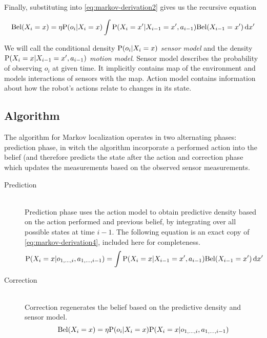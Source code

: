 Finally, substituting into \eqref{eq:markov-derivation2} gives us the recursive
equation

\begin{equation}
	\label{eq:markov-final}
	\Bel(X_i = x) =
	\eta \P(o_i | X_i = x)
		\int
		\P(X_i = x' | X_{i - 1}=x', a_{i - 1})
		\Bel(X_{i-1} = x')
		\,\mathrm{d}x'
\end{equation}

We will call the conditional density \(\P(o_i | X_i = x)\) \emph{sensor model} and
the density \(\P(X_i = x | X_{i - 1}=x', a_{i - 1})\) \emph{motion model}.
Sensor model describes the probability of observing \(o_i\) at given time.
It implicitly contains map of the environment and models interactions of sensors with
the map.
Action model contains information about how the robot's actions relate to changes in its state.

\subsection{Algorithm}
The algorithm for Markov localization operates in two alternating phases:
prediction phase, in witch the algorithm incorporate a performed action into the belief
(and therefore predicts the state after the action and correction phase which updates
the measurements based on the observed sensor measurements.

\begin{description}
\item[Prediction] \hfill \\
	Prediction phase uses the action model to obtain predictive density based on the action performed
	and previous belief, by integrating over all possible states at time \(i - 1\).
	The following equation is an exact copy of \eqref{eq:markov-derivation4}, included here for completeness.
	\begin{equation}
		\label{eq:markov-prediction}
		\P(X_i = x | o_{1, \dotsc, i}, a_{1, \dotsc, i - 1}) = 
		\int
		\P(X_i = x | X_{i - 1}=x', a_{i - 1})
		\Bel(X_{i-1} = x')
		\,\mathrm{d}x'
	\end{equation}

\item[Correction] \hfill \\
	Correction regenerates the belief based on the predictive density
	and sensor model.
	\begin{equation}
		\label{eq:markov-correction}
		\Bel(X_i = x) =
		\eta \P(o_i | X_i = x)
		\P(X_i = x | o_{1, \dotsc, i}, a_{1, \dotsc, i - 1})
	\end{equation}
\end{description}


